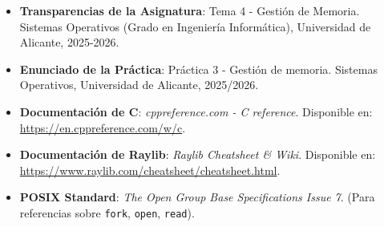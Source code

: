 \documentclass[11pt,a4paper]{article}
\begin{document}
\begin{itemize}
  \item \textbf{Transparencias de la Asignatura}: Tema 4 - Gestión de Memoria. Sistemas Operativos (Grado en Ingeniería Informática), Universidad de Alicante, 2025-2026.
  \item \textbf{Enunciado de la Práctica}: Práctica 3 - Gestión de memoria. Sistemas Operativos, Universidad de Alicante, 2025/2026.
  \item \textbf{Documentación de C}: \textit{cppreference.com - C reference}. Disponible en: \url{https://en.cppreference.com/w/c}.
  \item \textbf{Documentación de Raylib}: \textit{Raylib Cheatsheet \& Wiki}. Disponible en: \url{https://www.raylib.com/cheatsheet/cheatsheet.html}.
  \item \textbf{POSIX Standard}: \textit{The Open Group Base Specifications Issue 7}. (Para referencias sobre \texttt{fork}, \texttt{open}, \texttt{read}).
\end{itemize}
  
\end{document}
